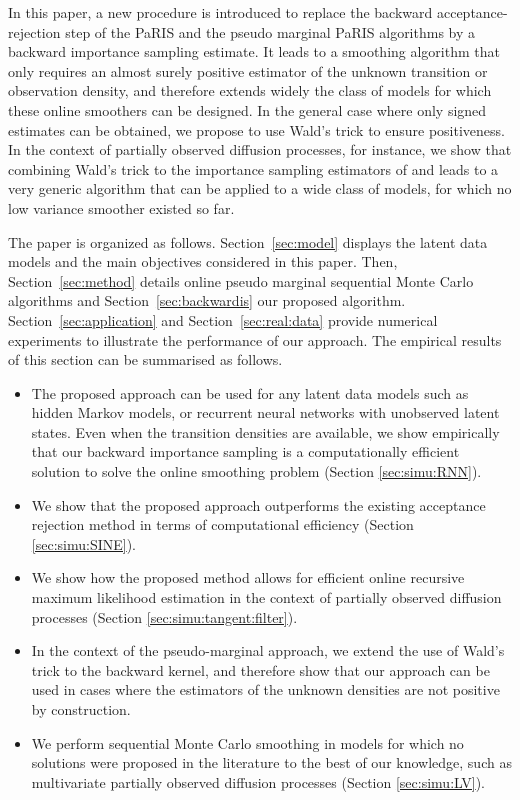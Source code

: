 \documentclass[12pt]{article}
\begin{document}
In this paper, a new procedure is introduced to replace the backward acceptance-rejection step of the PaRIS and the pseudo marginal PaRIS algorithms by a backward importance sampling estimate.  %
It leads to a smoothing algorithm that only requires an almost surely positive estimator of the unknown transition or observation density, and therefore extends widely the class of models for which these online smoothers can be designed. 
In the general case where only signed estimates can be obtained, we propose to use  Wald's trick to ensure positiveness. 
 In the context of partially observed diffusion processes, for instance,  we show that combining Wald's trick to the importance sampling estimators of \cite{andersson2017unbiased} and \cite{fearnhead2017continuous} leads to a very generic algorithm that can be applied to a wide class of models, for which no low variance smoother existed so far.

The paper is organized as follows. Section~\ref{sec:model} displays the latent data models and the main objectives considered in this paper. Then, Section~\ref{sec:method} details online pseudo marginal sequential Monte Carlo algorithms and Section~\ref{sec:backwardis} our proposed algorithm. Section~\ref{sec:application} and Section~\ref{sec:real:data}  provide  numerical experiments to illustrate the performance of our approach. The empirical results of this section can be summarised as follows.
\begin{itemize}
\item The proposed approach can be used for any latent data models such as hidden Markov models, or recurrent neural networks with unobserved latent states. Even when the transition densities are available, we show empirically that our backward importance sampling is a computationally efficient solution to solve the online smoothing problem (Section \ref{sec:simu:RNN}).
\item We show that the proposed approach outperforms the existing acceptance rejection method in terms of computational efficiency (Section \ref{sec:simu:SINE}). 
\item We show how the proposed method allows for efficient online recursive maximum likelihood estimation in the context of partially observed diffusion processes (Section \ref{sec:simu:tangent:filter}).
\item In the context of the pseudo-marginal approach, we extend the use of Wald's trick to the backward kernel, and therefore show that our approach can be used in cases where the estimators of the unknown densities  are not positive by construction.
\item  We perform sequential Monte Carlo smoothing in models for which no solutions were proposed in the literature to the best of our knowledge, such as multivariate partially observed diffusion processes (Section \ref{sec:simu:LV}).
\end{itemize}
\end{document}

